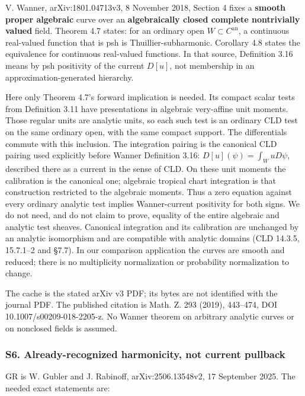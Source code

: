 \documentclass[
  11pt,
]{article}
\begin{document}
V. Wanner, arXiv:1801.04713v3, 8 November 2018, Section 4 fixes a
\textbf{smooth proper algebraic} curve over an \textbf{algebraically
closed complete nontrivially valued} field. Theorem 4.7 states: for an
ordinary open \(W\subset C^{\mathrm{an}}\), a continuous real-valued
function that is psh is Thuillier-subharmonic. Corollary 4.8 states the
equivalence for continuous real-valued functions. In that source,
Definition 3.16 means by psh positivity of the current \(D[u]\), not
membership in an approximation-generated hierarchy.

Here only Theorem 4.7's forward implication is needed. Its compact
scalar tests from Definition 3.11 have presentations in algebraic
very-affine unit moments. Those regular units are analytic units, so
each such test is an ordinary CLD test on the same ordinary open, with
the same compact support. The differentials commute with this inclusion.
The integration pairing is the canonical CLD pairing used explicitly
before Wanner Definition 3.16: \(D[u](\psi)=\int_W uD\psi\), described
there as a current in the sense of CLD. On these unit moments the
calibration is the canonical one; algebraic tropical chart integration
is that construction restricted to the algebraic moments. Thus a zero
equation against every ordinary analytic test implies Wanner-current
positivity for both signs. We do not need, and do not claim to prove,
equality of the entire algebraic and analytic test sheaves. Canonical
integration and its calibration are unchanged by an analytic isomorphism
and are compatible with analytic domains (CLD 14.3.5, 15.7.1--2 and
§7.7). In our comparison application the curves are smooth and reduced;
there is no multiplicity normalization or probability normalization to
change.

The cache is the stated arXiv v3 PDF; its bytes are not identified with
the journal PDF. The published citation is Math. Z. 293 (2019),
443--474, DOI 10.1007/s00209-018-2205-z. No Wanner theorem on arbitrary
analytic curves or on nonclosed fields is assumed.

\subsubsection{S6. Already-recognized harmonicity, not current
pullback}\label{s6.-already-recognized-harmonicity-not-current-pullback}

GR is W. Gubler and J. Rabinoff, arXiv:2506.13548v2, 17 September 2025.
The needed exact statements are:
\end{document}

